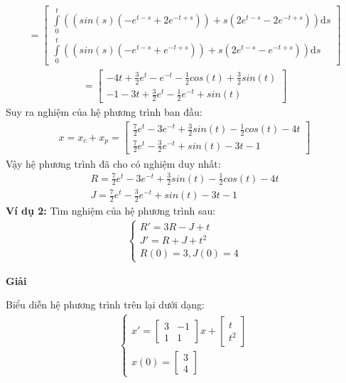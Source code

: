 \begin{align*}
    =\begin{bmatrix}
\displaystyle\int\limits_{0}^{t}((sin(s)(-e^{t-s}+2e^{-t+s}))+s(2e^{t-s}-2e^{-t+s}))\mathrm{d}s\\
\displaystyle\int\limits_{0}^{t}((sin(s)(-e^{t-s}+e^{-t+s}))+s(2e^{t-s}-e^{-t+s}))\mathrm{d}s
\end{bmatrix}
\end{align*}
\begin{align*}
    =\begin{bmatrix}
    -4t+\frac{3}{2}e^t-e^{-t}-\frac{1}{2}cos(t)+\frac{3}{2}sin(t) \\
    -1-3t+\frac{3}{2}e^t-\frac{1}{2}e^{-t}+sin(t)
\end{bmatrix}
\end{align*}
Suy ra nghiệm của hệ phương trình ban đầu:\\
\begin{align*}
    x=x_c+x_p
=\begin{bmatrix}
    \frac{7}{2}e^t-3e^{-t}+\frac{3}{2}sin(t)-\frac{1}{2}cos(t)-4t\\
    \frac{7}{2}e^t-\frac{3}{2}e^{-t}+sin(t)-3t-1
\end{bmatrix}
\end{align*}
Vậy hệ phương trình đã cho có nghiệm duy nhất:
\begin{align*}
    R= \frac{7}{2}e^t-3e^{-t}+\frac{3}{2}sin(t)-\frac{1}{2}cos(t)-4t\\
    J= \frac{7}{2}e^t-\frac{3}{2}e^{-t}+sin(t)-3t-1
\end{align*}
\textbf{Ví dụ 2:} Tìm nghiệm của hệ phương trình sau:
\begin{align*}
    \begin{cases}
        R'=3R-J+t\\
        J'=R+J+t^2\\
        R(0)=3, J(0)=4
    \end{cases}
\end{align*}
\centerline{\textbf{Giải}}
Biểu diễn hệ phương trình trên lại dưới dạng:
\begin{align*}
    \begin{cases}
        x'=
        \begin{bmatrix}
        3 & -1\\
        1 & 1
        \end{bmatrix}
        x+
        \begin{bmatrix}
        t\\
        t^2
        \end{bmatrix}\\
        x(0)=\begin{bmatrix}
        3\\
        4
        \end{bmatrix}
    \end{cases}
\end{align*}

